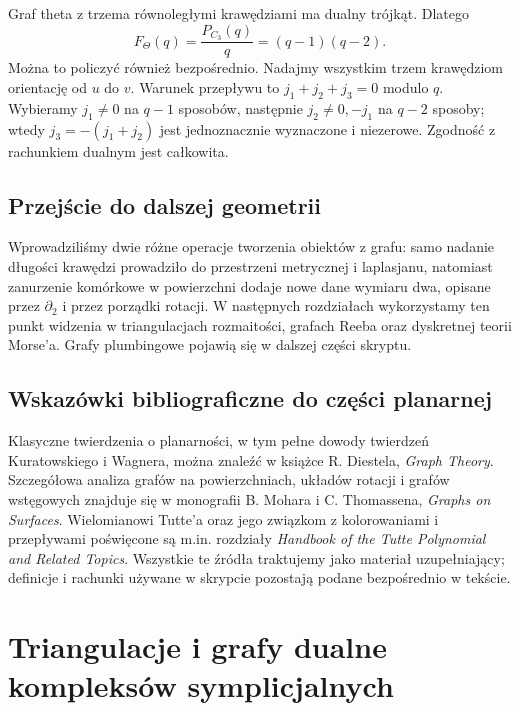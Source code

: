 \begin{przyklad}
Graf theta z trzema równoległymi krawędziami ma dualny
trójkąt. Dlatego
\[
 F_{\Theta}(q)=\frac{P_{C_3}(q)}{q}=(q-1)(q-2).
\]
Można to policzyć również bezpośrednio. Nadajmy wszystkim
trzem krawędziom orientację od $u$ do $v$.
Warunek przepływu to $j_1+j_2+j_3=0$ modulo $q$.
Wybieramy $j_1\ne0$ na $q-1$ sposobów, następnie
$j_2\ne0,-j_1$ na $q-2$ sposoby; wtedy
$j_3=-(j_1+j_2)$ jest jednoznacznie wyznaczone i niezerowe.
Zgodność z rachunkiem dualnym jest całkowita.
\end{przyklad}

\section*{Przejście do dalszej geometrii}
Wprowadziliśmy dwie różne operacje tworzenia obiektów
z grafu: samo nadanie długości krawędzi prowadziło
do przestrzeni metrycznej i laplasjanu, natomiast
zanurzenie komórkowe w powierzchni dodaje nowe dane
wymiaru dwa, opisane przez $\partial_2$ i przez porządki
rotacji. W następnych rozdziałach wykorzystamy ten punkt widzenia
w triangulacjach rozmaitości, grafach Reeba oraz dyskretnej
teorii Morse'a. Grafy plumbingowe pojawią się w dalszej części skryptu.

\section*{Wskazówki bibliograficzne do części planarnej}
Klasyczne twierdzenia o planarności, w tym pełne dowody
twierdzeń Kuratowskiego i Wagnera, można znaleźć w książce
R. Diestela, \emph{Graph Theory}. Szczegółowa analiza
grafów na powierzchniach, układów rotacji i grafów wstęgowych
znajduje się w monografii B. Mohara i C. Thomassena,
\emph{Graphs on Surfaces}. Wielomianowi Tutte'a oraz jego
związkom z kolorowaniami i przepływami poświęcone są m.in.
rozdziały \emph{Handbook of the Tutte Polynomial and Related Topics}.
Wszystkie te źródła traktujemy jako materiał uzupełniający;
definicje i rachunki używane w skrypcie pozostają podane
bezpośrednio w tekście.


\chapter{Triangulacje i grafy dualne kompleksów symplicjalnych}
\label{ch:tg-triangulacje}

